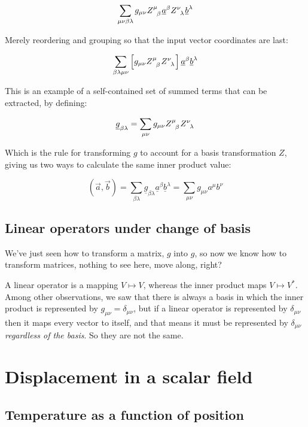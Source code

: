 $$
\sum_{\mu\nu\beta\lambda} g_{\mu\nu} Z\indices{^\mu_\beta} \underline{a}^{\beta} Z\indices{^\nu_\lambda} \underline{b}^{\lambda}
$$

Merely reordering and grouping so that the input vector coordinates are last:

$$
\sum_{\beta\lambda\mu\nu} \left[g_{\mu\nu} Z\indices{^\mu_\beta} Z\indices{^\nu_\lambda} \right] \underline{a}^{\beta} \underline{b}^{\lambda} 
$$

This is an example of a self-contained set of summed terms that can be extracted, by defining:

$$
\underline{g}_{\beta\lambda} = 
\sum_{\mu\nu} g_{\mu\nu} Z\indices{^\mu_\beta} Z\indices{^\nu_\lambda}
$$

Which is the rule for transforming $g$ to account for a basis transformation $Z$, giving us two ways to calculate the same inner product value:

$$
(\vec{a}, \vec{b})
= 
\sum_{\beta\lambda} \underline{g}_{\beta\lambda} \underline{a}^{\beta} \underline{b}^{\lambda}
= 
\sum_{\mu\nu} g_{\mu\nu} a^{\mu} b^{\nu}
$$

\subsection{Linear operators under change of basis}

We've just seen how to transform a matrix, $g$ into $g$, so now we know how to transform matrices, nothing to see here, move along, right?

A linear operator is a mapping $V \mapsto V$, whereas the inner product maps $V \mapsto V^*$. Among other observations, we saw that there is always a basis in which the inner product is represented by $g_{\mu\nu} = \delta_{\mu\nu}$, but if a linear operator is represented by $\delta_{\mu\nu}$ then it maps every vector to itself, and that means it must be represented by $\delta_{\mu\nu}$ \textit{regardless of the basis}. So they are not the same.




\section{Displacement in a scalar field}

\subsection{Temperature as a function of position}

